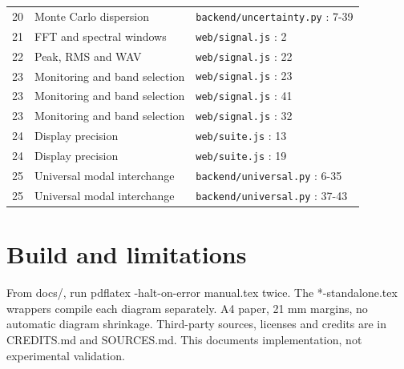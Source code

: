 \documentclass[10pt,a4paper]{article}
\begin{document}
\begin{longtable}{p{8mm}p{75mm}p{65mm}}
20 & Monte Carlo dispersion & \texttt{backend/uncertainty.py} : 7-39\\[3pt]
21 & FFT and spectral windows & \texttt{web/signal.js} : 2\\[3pt]
22 & Peak, RMS and WAV & \texttt{web/signal.js} : 22\\[3pt]
23 & Monitoring and band selection & \texttt{web/signal.js} : 23\\[3pt]
23 & Monitoring and band selection & \texttt{web/signal.js} : 41\\[3pt]
23 & Monitoring and band selection & \texttt{web/signal.js} : 32\\[3pt]
24 & Display precision & \texttt{web/suite.js} : 13\\[3pt]
24 & Display precision & \texttt{web/suite.js} : 19\\[3pt]
25 & Universal modal interchange & \texttt{backend/universal.py} : 6-35\\[3pt]
25 & Universal modal interchange & \texttt{backend/universal.py} : 37-43\\[3pt]
\bottomrule\end{longtable}\normalsize
{}\section{Build and limitations}

From docs/, run pdflatex -halt-on-error manual.tex twice. The *-standalone.tex wrappers compile each diagram separately. A4 paper, 21 mm margins, no automatic diagram shrinkage. Third-party sources, licenses and credits are in CREDITS.md and SOURCES.md. This documents implementation, not experimental validation.\par
\end{document}
